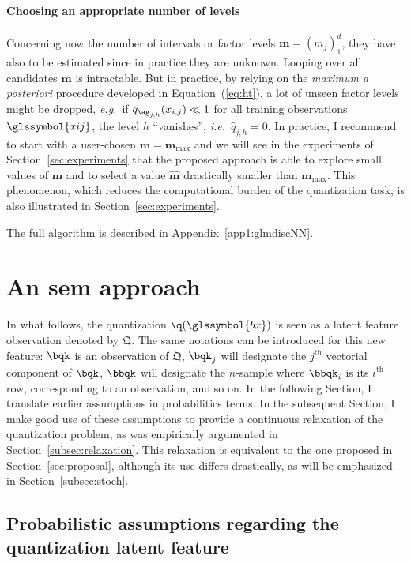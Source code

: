 \paragraph{Choosing an appropriate number of levels}

Concerning now the number of intervals or factor levels $\boldsymbol{m} = (m_j)_1^d$, they have also to be estimated since in practice they are unknown. Looping over all candidates $\boldsymbol{m}$ is intractable. But in practice, by relying on the \textit{maximum a posteriori} procedure developed in Equation~(\ref{eq:ht}), a lot of unseen factor levels might be dropped, \textit{e.g.}\ if $q_{\ag_{j,h}}(x_{i,j}) \ll 1$ for all training observations $\glssymbol{xij}$, the level $h$ ``vanishes'', \textit{i.e.}\ $\hat{q}_{j,h} = 0$. In practice, I recommend to start with a user-chosen $\bm{m}=\boldsymbol{m}_{\max}$ and we will see in the experiments of Section~\ref{sec:experiments} that the proposed approach is able to explore small values of $\boldsymbol{m}$ and to select a value $\hat{\boldsymbol{m}}$ drastically smaller than $\boldsymbol{m}_{\max}$. This phenomenon, which reduces the computational burden of the quantization task, is also illustrated in Section~\ref{sec:experiments}.

The full algorithm is described in Appendix~\ref{app1:glmdiscNN}.


\section{An \gls{sem} approach} \label{sec:sem}
 
 
In what follows, the quantization $\q(\glssymbol{bx})$ is seen as a latent feature observation denoted by $\bm{\mathfrak{Q}}$. The same notations can be introduced for this new feature:  $\bqk$ is an observation of $\bm{\mathfrak{Q}}$, $\bqk_j$ will designate the $j^{\text{th}}$ vectorial component of $\bqk$, $\bbqk$ will designate the $n$-sample where $\bbqk_i$ is its $i^{\text{th}}$ row, corresponding to an observation, and so on. In the following Section, I translate earlier assumptions in probabilitics terms. In the subsequent Section, I make good use of these assumptions to provide a continuous relaxation of the quantization problem, as was empirically argumented in Section~\ref{subsec:relaxation}. This relaxation is equivalent to the one proposed in Section~\ref{sec:proposal}, although its use differs drastically, as will be emphasized in Section~\ref{subsec:stoch}.

\subsection{Probabilistic assumptions regarding the quantization latent feature}


